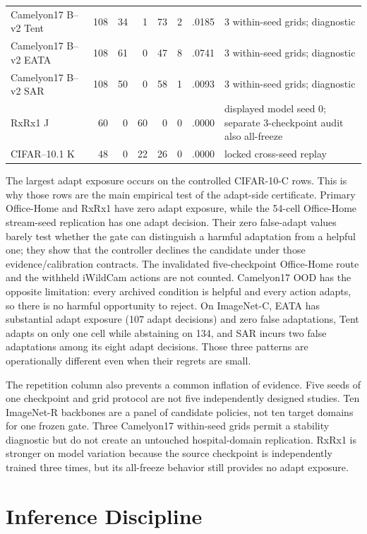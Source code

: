 \begin{table}[!t]
\begin{tabular}{@{}p{}rrrrrrp{}@{}}
Camelyon17 B--v2 Tent & 108 & 34 & 1 & 73 & 2 & .0185 & 3 within-seed grids; diagnostic \\
Camelyon17 B--v2 EATA & 108 & 61 & 0 & 47 & 8 & .0741 & 3 within-seed grids; diagnostic \\
Camelyon17 B--v2 SAR & 108 & 50 & 0 & 58 & 1 & .0093 & 3 within-seed grids; diagnostic \\
RxRx1 J & 60 & 0 & 60 & 0 & 0 & .0000 & displayed model seed 0; separate 3-checkpoint audit also all-freeze \\
CIFAR--10.1 K & 48 & 0 & 22 & 26 & 0 & .0000 & locked cross-seed replay \\
\bottomrule
\end{tabular}
\end{table}

The largest adapt exposure occurs on the controlled CIFAR-10-C rows. This is why those rows are the
main empirical test of the adapt-side certificate. Primary Office-Home and RxRx1 have zero adapt
exposure, while the 54-cell Office-Home stream-seed replication has one adapt decision. Their zero
false-adapt values barely test whether the gate can distinguish a harmful adaptation from a helpful
one; they show that the controller declines the candidate under those evidence/calibration
contracts. The invalidated five-checkpoint Office-Home route and the withheld iWildCam actions are
not counted. Camelyon17 OOD has the opposite limitation: every archived condition is helpful and
every action adapts, so there is no harmful opportunity to reject. On ImageNet-C, EATA has substantial
adapt exposure (107 adapt decisions) and zero false adaptations, Tent adapts on only one cell while abstaining
on 134, and SAR incurs two false adaptations among its eight adapt decisions. Those three patterns are operationally different even when their regrets are
small.

The repetition column also prevents a common inflation of evidence. Five seeds of one checkpoint
and grid protocol are not five independently designed studies. Ten ImageNet-R backbones are a panel
of candidate policies, not ten target domains for one frozen gate. Three Camelyon17 within-seed
grids permit a stability diagnostic but do not create an untouched hospital-domain replication.
RxRx1 is stronger on model variation because the source checkpoint is independently trained three
times, but its all-freeze behavior still provides no adapt exposure.

\section{Inference Discipline}
\label{app:compact-inference}

